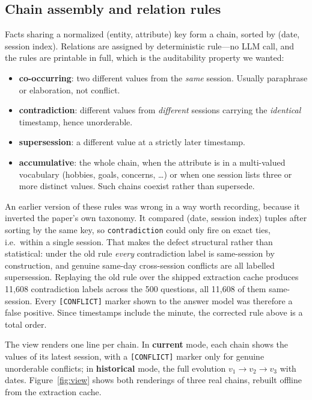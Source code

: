 \documentclass[11pt]{article}
\begin{document}
\subsection{Chain assembly and relation rules}
\label{sec:rules}

Facts sharing a normalized (entity, attribute) key form a chain, sorted by (date, session index). Relations are assigned by deterministic rule---no LLM call, and the rules are printable in full, which is the auditability property we wanted:

\begin{itemize}
\item \textbf{co-occurring}: two different values from the \emph{same} session. Usually paraphrase or elaboration, not conflict.
\item \textbf{contradiction}: different values from \emph{different} sessions carrying the \emph{identical} timestamp, hence unorderable.
\item \textbf{supersession}: a different value at a strictly later timestamp.
\item \textbf{accumulative}: the whole chain, when the attribute is in a multi-valued vocabulary (hobbies, goals, concerns, \ldots) or when one session lists three or more distinct values. Such chains coexist rather than supersede.
\end{itemize}

An earlier version of these rules was wrong in a way worth recording, because it inverted the paper's own taxonomy. It compared (date, session index) tuples after sorting by the same key, so \texttt{contradiction} could only fire on exact ties, i.e.\ within a single session. That makes the defect structural rather than statistical: under the old rule \emph{every} contradiction label is same-session by construction, and genuine same-day cross-session conflicts are all labelled supersession. Replaying the old rule over the shipped extraction cache produces 11{,}608 contradiction labels across the 500 questions, all 11{,}608 of them same-session. Every \texttt{[CONFLICT]} marker shown to the answer model was therefore a false positive. Since timestamps include the minute, the corrected rule above is a total order.

The view renders one line per chain. In \textbf{current} mode, each chain shows the values of its latest session, with a \texttt{[CONFLICT]} marker only for genuine unorderable conflicts; in \textbf{historical} mode, the full evolution $v_1 \rightarrow v_2 \rightarrow v_3$ with dates. Figure~\ref{fig:view} shows both renderings of three real chains, rebuilt offline from the extraction cache.
\end{document}
